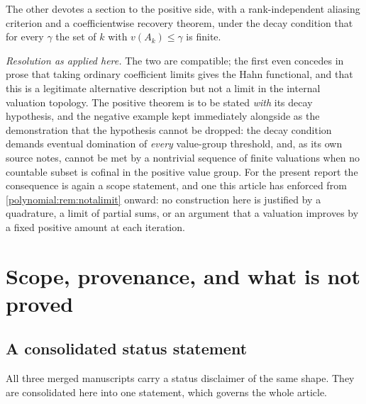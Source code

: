 \documentclass[11pt,letterpaper]{article}
\numberwithin{equation}{section}
\theoremstyle{definition}
\theoremstyle{remark}\newtheorem{remark}[theorem]{Remark}
\begin{document}
The other devotes a section to the positive side, with a rank-independent
aliasing criterion and a coefficientwise recovery theorem, under the decay
condition that for every $\gamma$ the set of $k$ with $v(A_k)\le\gamma$ is
finite.

\emph{Resolution as applied here.} The two are compatible; the first even
concedes in prose that taking ordinary coefficient limits gives the Hahn
functional, and that this is a legitimate alternative description but not a
limit in the internal valuation topology. The positive theorem is to be stated
\emph{with} its decay hypothesis, and the negative example kept immediately
alongside as the demonstration that the hypothesis cannot be dropped: the
decay condition demands eventual domination of \emph{every} value-group
threshold, and, as its own source notes, cannot be met by a nontrivial
sequence of finite valuations when no countable subset is cofinal in the
positive value group. For the present report the consequence is again a scope
statement, and one this article has enforced from
\cref{polynomial:rem:notalimit} onward: no construction here is justified by a
quadrature, a limit of partial sums, or an argument that a valuation improves
by a fixed positive amount at each iteration.

\section{Scope, provenance, and what is not proved}\label{polynomial:sec:scope}

\subsection{A consolidated status statement}
All three merged manuscripts carry a status disclaimer of the same shape. They
are consolidated here into one statement, which governs the whole article.
\end{document}
